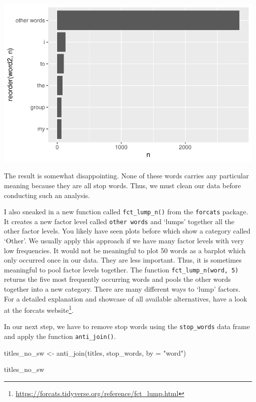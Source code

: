 \documentclass[
  letterpaper,
]{krantz}
\makeatletter
\newenvironment{Shaded}{\begin{snugshade}}{\end{snugshade}}
\newcommand{\AttributeTok}[1]{\textcolor[rgb]{0.40,0.45,0.13}{#1}}
\newcommand{\FunctionTok}[1]{\textcolor[rgb]{0.28,0.35,0.67}{#1}}
\newcommand{\NormalTok}[1]{\textcolor[rgb]{0.00,0.23,0.31}{#1}}
\newcommand{\OtherTok}[1]{\textcolor[rgb]{0.00,0.23,0.31}{#1}}
\newcommand{\StringTok}[1]{\textcolor[rgb]{0.13,0.47,0.30}{#1}}
\renewcommand{\href}[2]{#2\footnote{\url{#1}}}
\newenvironment{kframe}{%
\medskip{}
\setlength{\fboxsep}{.8em}
 \def\at@end@of@kframe{}%
 \ifinner\ifhmode%
  \def\at@end@of@kframe{\end{minipage}}%
  \begin{minipage}{\columnwidth}%
 \fi\fi%
 \def\FrameCommand##1{\hskip\@totalleftmargin \hskip-\fboxsep
 \colorbox{shadecolor}{##1}\hskip-\fboxsep
     \hskip-\linewidth \hskip-\@totalleftmargin \hskip\columnwidth}%
 \MakeFramed {\advance\hsize-\width
   \@totalleftmargin\z@ \linewidth\hsize
   \@setminipage}}%
 {\par\unskip\endMakeFramed%
 \at@end@of@kframe}
\renewenvironment{Shaded}{\begin{kframe}}{\end{kframe}}
\makeatother
\begin{document}
\includegraphics{14_mixed_methods_files/figure-pdf/freq-words-before-stopwords-removal-1.pdf}

The result is somewhat disappointing. None of these words carries any
particular meaning because they are all stop words. Thus, we must clean
our data before conducting such an analysis.

I also sneaked in a new function called \texttt{fct\_lump\_n()} from the
\texttt{forcats} package. It creates a new factor level called
\texttt{other\ words} and `lumps' together all the other factor levels.
You likely have seen plots before which show a category called `Other'.
We usually apply this approach if we have many factor levels with very
low frequencies. It would not be meaningful to plot 50 words as a
barplot which only occurred once in our data. They are less important.
Thus, it is sometimes meaningful to pool factor levels together. The
function \texttt{fct\_lump\_n(word,\ 5)} returns the five most
frequently occurring words and pools the other words together into a new
category. There are many different ways to `lump' factors. For a
detailed explanation and showcase of all available alternatives, have a
look at the
\href{https://forcats.tidyverse.org/reference/fct_lump.html}{forcats
website}.

In our next step, we have to remove stop words using the
\texttt{stop\_words} data frame and apply the function
\texttt{anti\_join()}.

\begin{Shaded}
\begin{Highlighting}[]
\NormalTok{titles\_no\_sw }\OtherTok{\textless{}{-}} \FunctionTok{anti\_join}\NormalTok{(titles, stop\_words,}
                          \AttributeTok{by =} \StringTok{"word"}\NormalTok{)}

\NormalTok{titles\_no\_sw}
\end{Highlighting}
\end{Shaded}
\end{document}
